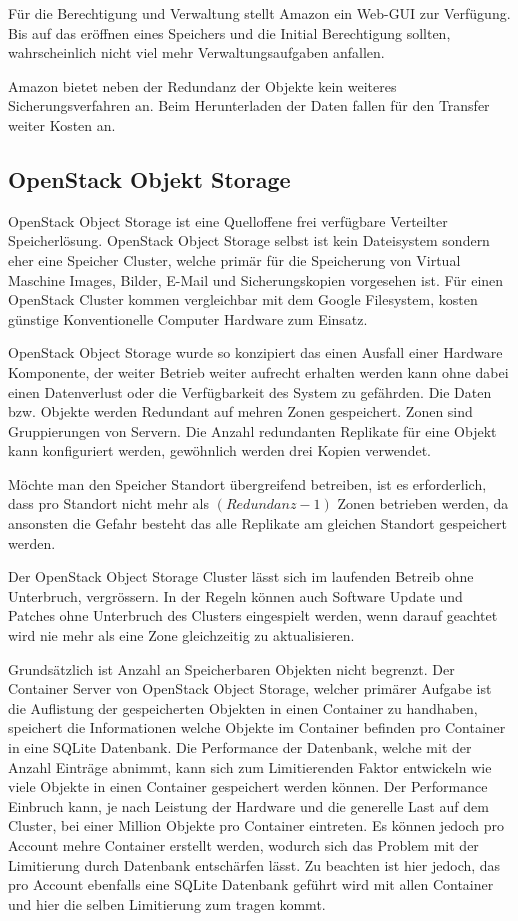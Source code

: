 Für die Berechtigung und Verwaltung stellt Amazon ein Web-GUI zur Verfügung. Bis auf das eröffnen eines Speichers und die Initial Berechtigung sollten, wahrscheinlich nicht viel mehr Verwaltungsaufgaben anfallen.

Amazon bietet neben der Redundanz der Objekte kein weiteres Sicherungsverfahren an. Beim Herunterladen der Daten fallen für den Transfer weiter Kosten an.

\subsection{OpenStack Objekt Storage}
OpenStack Object Storage ist eine Quelloffene frei verfügbare Verteilter Speicherlösung. OpenStack Object Storage selbst ist kein Dateisystem sondern eher eine Speicher Cluster, welche primär für die Speicherung von Virtual Maschine Images, Bilder, E-Mail und Sicherungskopien vorgesehen ist. Für einen OpenStack Cluster kommen vergleichbar mit dem Google Filesystem, kosten günstige Konventionelle Computer Hardware zum Einsatz. 



OpenStack Object Storage wurde so konzipiert das einen Ausfall einer Hardware Komponente, der weiter Betrieb weiter aufrecht erhalten werden kann ohne dabei einen Datenverlust oder die Verfügbarkeit des System zu gefährden. Die Daten bzw. Objekte werden Redundant auf mehren Zonen gespeichert. Zonen sind Gruppierungen von Servern. Die Anzahl redundanten Replikate für eine Objekt kann konfiguriert werden, gewöhnlich werden drei Kopien verwendet.

Möchte man den Speicher Standort übergreifend betreiben, ist es erforderlich, dass pro Standort nicht mehr als $(Redundanz -1)$ Zonen betrieben werden, da ansonsten die Gefahr besteht das alle Replikate am gleichen Standort gespeichert werden.

Der OpenStack Object Storage Cluster lässt sich im laufenden Betreib ohne Unterbruch, vergrössern. In der Regeln können auch Software Update und Patches ohne Unterbruch des Clusters eingespielt werden, wenn darauf geachtet wird nie mehr als eine Zone gleichzeitig zu aktualisieren.

Grundsätzlich ist Anzahl an Speicherbaren Objekten nicht begrenzt. Der Container Server von OpenStack Object Storage, welcher primärer Aufgabe ist die Auflistung der gespeicherten Objekten in einen Container zu handhaben, speichert die Informationen welche Objekte im Container befinden pro Container in eine SQLite Datenbank. Die Performance der Datenbank, welche mit der Anzahl Einträge abnimmt, kann sich zum Limitierenden Faktor entwickeln wie viele Objekte in einen Container gespeichert werden können. Der Performance Einbruch kann, je nach Leistung der Hardware und die generelle Last auf dem Cluster, bei einer Million Objekte pro Container eintreten. Es können jedoch pro Account mehre Container erstellt werden, wodurch sich das Problem mit der Limitierung durch Datenbank entschärfen lässt. Zu beachten ist hier jedoch, das pro Account ebenfalls eine SQLite Datenbank geführt wird mit allen Container und hier die selben Limitierung zum tragen kommt.\cite{OpenStack2012}\cite{A2011}

